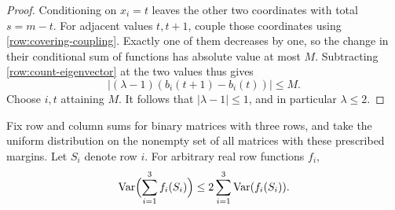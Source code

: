 \begin{proof}
Conditioning on $x_i=t$ leaves the other two coordinates with total
$s=m-t$.  For adjacent values $t,t+1$, couple those coordinates using
\eqref{row:covering-coupling}.  Exactly one of them decreases by one,
so the change in their conditional sum of functions has absolute
value at most $M$.  Subtracting \eqref{row:count-eigenvector} at the two
values thus gives
\[
 |(\lambda-1)(b_i(t+1)-b_i(t))|\le M.
\]
Choose $i,t$ attaining $M$.  It follows that $|\lambda-1|\le1$, and
in particular $\lambda\le2$.
\end{proof}

\begin{lemma}\label{row:variance}
Fix row and column sums for binary matrices with three rows, and take
the uniform distribution on the nonempty set of all matrices with
these prescribed margins.
Let $S_i$ denote row $i$.  For arbitrary real row functions $f_i$,
\begin{equation}\label{row:main-variance}
 \operatorname{Var}\Bigl(\sum_{i=1}^3f_i(S_i)\Bigr)
 \le 2\sum_{i=1}^3\operatorname{Var}(f_i(S_i)).
\end{equation}
\end{lemma}
